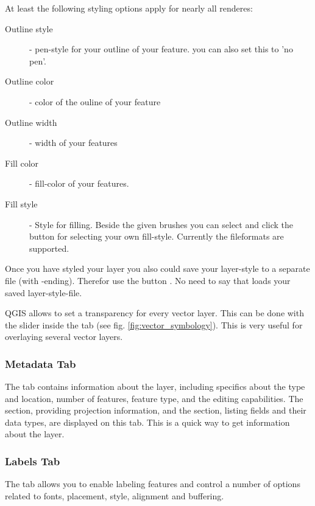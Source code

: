 At least the following styling options apply for nearly all renderes:
\begin{description}
 \item[Outline style] - pen-style for your outline of your feature. you can
 also set this to 'no pen'.
 \item[Outline color] - color of the ouline of your feature
 \item[Outline width] - width of your features
 \item[Fill color] - fill-color of your features.
 \item[Fill style] - Style for filling. Beside the given brushes you can
 select  and click the \browsebutton
 button for selecting your own fill-style. Currently the fileformats
  are supported.
\end{description}

Once you have styled your layer you also could save your layer-style to a
separate file (with -ending).
Therefor use the button . No need to say that
 loads your saved layer-style-file.

 \label{sec:vect_transparency} 
QGIS \CURRENT allows to set a transparency for every vector layer. This can be done with
the slider  inside the tab  (see fig. \ref{fig:vector_symbology}).
This is very useful for overlaying several vector layers.

\subsubsection{Metadata Tab}

The  tab contains information about the layer, including specifics
about the type and location, number of features, feature type, and the editing
capabilities. The  section, providing projection information, and the  section,
listing fields and their data types, are displayed 
on this tab. This is a quick way to get information about the layer.

\subsubsection{Labels Tab}

The  tab allows you to enable labeling features and control a number of
options related to fonts, placement, style, alignment and buffering.

